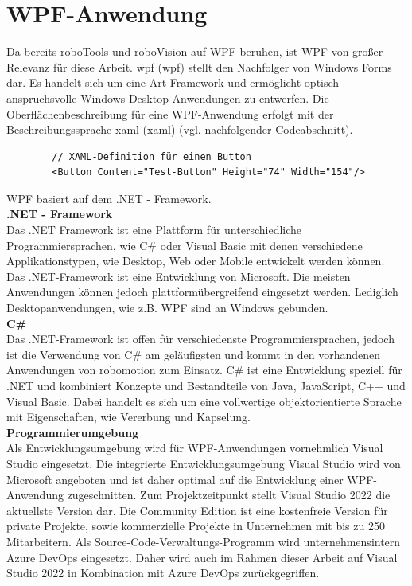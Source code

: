 \documentclass[ a4paper,
                oneside,
                toc=bibliography,
                toc=listof
                ]{scrbook}
\begin{document}
   	
   	
   	\section{WPF-Anwendung}
   	\label{sec:WPF}
   	Da bereits roboTools und roboVision auf WPF beruhen, ist WPF von großer Relevanz für diese Arbeit.
   	\ac{wpf} (\acl{wpf}) stellt den Nachfolger von Windows Forms dar. Es handelt sich um eine Art Framework und ermöglicht optisch anspruchsvolle Windows-Desktop-Anwendungen zu entwerfen. Die Oberflächenbeschreibung für eine WPF-Anwendung erfolgt mit der Beschreibungssprache \acs{xaml} (\acl{xaml}) (vgl. nachfolgender Codeabschnitt). \cite{kotz2022c}
   	\begin{lstlisting}
   		// XAML-Definition für einen Button
   		<Button Content="Test-Button" Height="74" Width="154"/>
   	\end{lstlisting}
   	WPF basiert auf dem .NET - Framework.\\
   	\textbf{.NET - Framework}\\
   	Das .NET Framework ist eine Plattform für unterschiedliche Programmiersprachen, wie C\# oder Visual Basic  mit denen verschiedene Applikationstypen, wie Desktop, Web oder Mobile entwickelt werden können.\\
   	Das .NET-Framework ist eine Entwicklung von Microsoft. Die meisten Anwendungen können jedoch plattformübergreifend eingesetzt werden. Lediglich Desktopanwendungen, wie z.B. WPF sind an Windows gebunden.  \cite{kotz2022c} \cite{troelsen2022pro}\\
   	\textbf{C\#}\\
   	Das .NET-Framework ist offen für verschiedenste Programmiersprachen, jedoch ist die Verwendung von C\# am geläufigsten und kommt in den vorhandenen Anwendungen von robomotion zum Einsatz. C\# ist eine Entwicklung speziell für .NET und kombiniert Konzepte und Bestandteile von Java, JavaScript, C++ und Visual Basic. Dabei handelt es sich um eine vollwertige objektorientierte Sprache mit Eigenschaften, wie Vererbung und Kapselung. \cite{kotz2022c} \cite{troelsen2022pro}\\
   	\textbf{Programmierumgebung}\\
   	Als Entwicklungsumgebung wird für WPF-Anwendungen vornehmlich Visual Studio eingesetzt. Die integrierte Entwicklungsumgebung Visual Studio wird von Microsoft angeboten und ist daher optimal auf die Entwicklung einer WPF-Anwendung zugeschnitten. Zum Projektzeitpunkt stellt Visual Studio 2022 die aktuellste Version dar. Die \glqq Community Edition\grqq{} ist eine kostenfreie Version für private Projekte, sowie kommerzielle Projekte in Unternehmen mit bis zu 250 Mitarbeitern. \cite{kotz2022c} Als Source-Code-Verwaltungs-Programm wird unternehmensintern \glqq Azure DevOps\grqq{} eingesetzt. Daher wird auch im Rahmen dieser Arbeit auf Visual Studio 2022 in Kombination mit Azure DevOps zurückgegriffen.\\
   	
\end{document}
